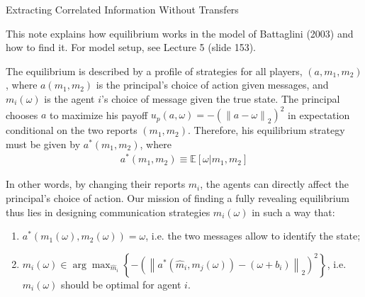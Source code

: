 \documentclass{article}
\begin{document}
\begin{center}
	{\Huge Extracting Correlated Information Without Transfers}
\end{center}
\bigskip

This note explains how equilibrium works in the model of Battaglini (2003) and how to find it. For model setup, see Lecture 5 (slide 153).

The equilibrium is described by a profile of strategies for all players, $(a,m_1,m_2)$, where $a(m_1,m_2)$ is the principal's choice of action given messages, and $m_i(\omega)$ is the agent $i$'s choice of message given the true state. The principal chooses $a$ to maximize his payoff $u_p(a,\omega) = -\left(\left\| a - \omega \right\|_2\right)^2$ in expectation conditional on the two reports $(m_1,m_2)$. Therefore, his equilibrium strategy must be given by $a^*(m_1,m_2)$, where
\begin{align}
	a^*(m_1,m_2) \equiv \mathbb{E} \left[ \omega | m_1, m_2 \right]
	\label{eq:optact}
\end{align}

In other words, by changing their reports $m_i$, the agents can directly affect the principal's choice of action. Our mission of finding a fully revealing equilibrium thus lies in designing communication strategies $m_i(\omega)$ in such a way that:
\begin{enumerate}
	\item $a^*(m_1(\omega),m_2(\omega)) = \omega$, i.e. the two messages allow to identify the state;
	\item $m_i(\omega) \in \arg \max_{\hat{m}_i} \left\{ -\left(\left\| a^*(\hat{m}_i,m_j(\omega)) - (\omega + b_i) \right\|_2\right)^2 \right\}$, i.e. $m_i(\omega)$ should be optimal for agent $i$.
\end{enumerate}
\end{document}
